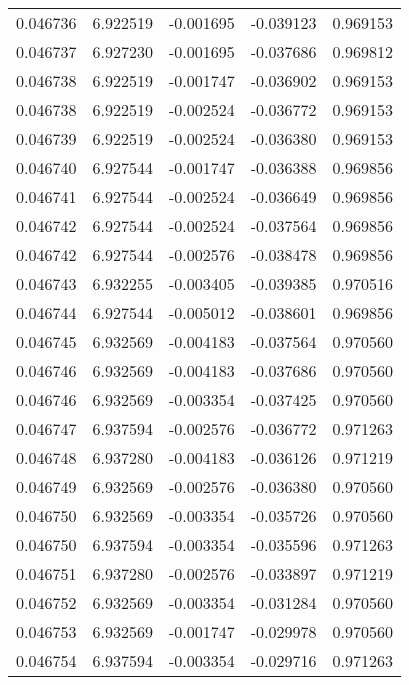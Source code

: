 \begin{tabular}{lrrrr}
0.046736    &  6.922519 & -0.001695 & -0.039123 &             0.969153 \\
0.046737    &  6.927230 & -0.001695 & -0.037686 &             0.969812 \\
0.046738    &  6.922519 & -0.001747 & -0.036902 &             0.969153 \\
0.046738    &  6.922519 & -0.002524 & -0.036772 &             0.969153 \\
0.046739    &  6.922519 & -0.002524 & -0.036380 &             0.969153 \\
0.046740    &  6.927544 & -0.001747 & -0.036388 &             0.969856 \\
0.046741    &  6.927544 & -0.002524 & -0.036649 &             0.969856 \\
0.046742    &  6.927544 & -0.002524 & -0.037564 &             0.969856 \\
0.046742    &  6.927544 & -0.002576 & -0.038478 &             0.969856 \\
0.046743    &  6.932255 & -0.003405 & -0.039385 &             0.970516 \\
0.046744    &  6.927544 & -0.005012 & -0.038601 &             0.969856 \\
0.046745    &  6.932569 & -0.004183 & -0.037564 &             0.970560 \\
0.046746    &  6.932569 & -0.004183 & -0.037686 &             0.970560 \\
0.046746    &  6.932569 & -0.003354 & -0.037425 &             0.970560 \\
0.046747    &  6.937594 & -0.002576 & -0.036772 &             0.971263 \\
0.046748    &  6.937280 & -0.004183 & -0.036126 &             0.971219 \\
0.046749    &  6.932569 & -0.002576 & -0.036380 &             0.970560 \\
0.046750    &  6.932569 & -0.003354 & -0.035726 &             0.970560 \\
0.046750    &  6.937594 & -0.003354 & -0.035596 &             0.971263 \\
0.046751    &  6.937280 & -0.002576 & -0.033897 &             0.971219 \\
0.046752    &  6.932569 & -0.003354 & -0.031284 &             0.970560 \\
0.046753    &  6.932569 & -0.001747 & -0.029978 &             0.970560 \\
0.046754    &  6.937594 & -0.003354 & -0.029716 &             0.971263 \\

\end{tabular}
